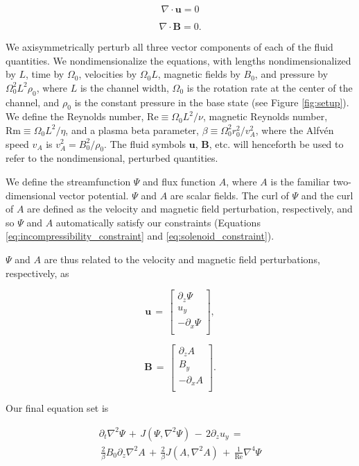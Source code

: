 \documentclass{emulateapj}
\newcommand{\beq}{\begin{equation}}
\newcommand{\eeq}{\end{equation}}
\newcommand\reye{\mathrm{Re}}
\newcommand\reym{\mathrm{Rm}}
\begin{document}
\beq\label{eq:incompressibility_constraint}
\nabla \cdot \mathbf{u} = 0
\eeq

\beq\label{eq:solenoid_constraint}
\nabla \cdot \mathbf{B} = 0.
\eeq


We axisymmetrically perturb all three vector components of each of the fluid quantities. We nondimensionalize the equations, with lengths nondimensionalized by $L$, time by $\Omega_0$, velocities by $\Omega_0 L$, magnetic fields by $B_0$, and pressure by $\Omega_0^2 L^2 \rho_0$, where $L$ is the channel width, $\Omega_0$ is the rotation rate at the center of the channel, and $\rho_0$ is the constant pressure in the base state (see Figure \ref{fig:setup}). We define the Reynolds number, $\reye \equiv {\Omega_0 L^2}/{\nu}$, magnetic Reynolds number, $\reym \equiv {\Omega_0 L^2}/{\eta}$, and a plasma beta parameter, $\beta \equiv {\Omega_0^2r_0^2}/{v_A^2}$, where the Alfv\'en speed $v_A$ is $v_A^2 = {B_0^2}/{\rho_0}$. The fluid symbols $\mathbf{u}$, $\mathbf{B}$, etc. will henceforth be used to refer to the nondimensional, perturbed quantities.

We define the streamfunction $\Psi$ and flux function $A$, where $A$ is the familiar two-dimensional vector potential. $\Psi$ and $A$ are scalar fields. The curl of $\Psi$ and the curl of $A$ are defined as the velocity and magnetic field perturbation, respectively, and so $\Psi$ and $A$ automatically satisfy our constraints (Equations \ref{eq:incompressibility_constraint} and \ref{eq:solenoid_constraint}).

$\Psi$ and $A$ are thus related to the velocity and magnetic field perturbations, respectively, as

\beq
\mathbf{u} \, = \, \left[\begin{matrix}
\partial_z \Psi \\
u_{y} \\
-\partial_x \Psi \\
\end{matrix}\right],\eeq

\beq
\mathbf{B} \, = \, \left[\begin{matrix}
\partial_zA \\
B_{y} \\
-\partial_xA \\
\end{matrix}\right].\eeq

Our final equation set is

\begin{multline}
\label{eqset1}
\partial_t \nabla^2 \Psi \, + \, J\left(\Psi, \nabla^2 \Psi\right) \, - \, 2 \partial_z u_{y} \, = \\
\, \frac{2}{\beta} B_0 \partial_z \nabla^2 A \, + \, \frac{2}{\beta}J\left(A, \nabla^2 A \right) \, + \, \frac{1}{\reye}\nabla^4 \Psi
\end{multline}
\end{document}
